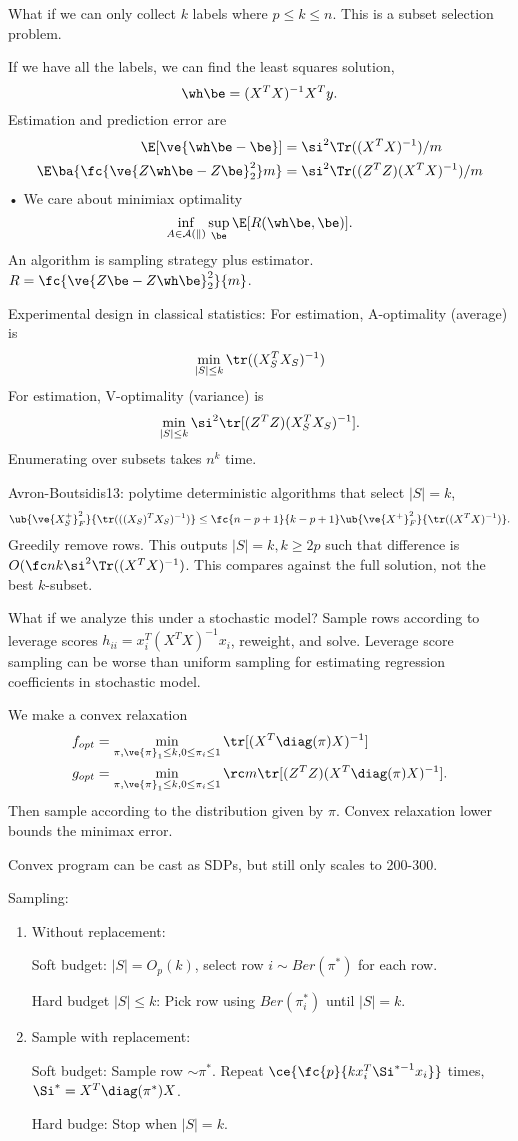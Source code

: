 What if we can only collect $k$ labels where $p\le k\le n$. This is a subset selection problem. 

If we have all the labels, we can find the least squares solution, 
$$
\wh \be = (X^TX)^{-1} X^Ty.
$$
Estimation and prediction error are
\begin{align}
\E[\ve{\wh \be - \be}] &= \si^2\Tr((X^TX)^{-1})/m\\
\E\ba{\fc{\ve{Z\wh \be - Z\be}_2^2}m}&=
\si^2 \Tr((Z^TZ)(X^TX)^{-1})/m
\end{align}•
We care about minimiax optimality
$$
\inf_{A\in \cal A(k)}\sup_\be \E[R(\wh \be , \be)].
$$
An algorithm is sampling strategy plus estimator. $R=\fc{\ve{Z\be - Z\wh \be }_2^2}{m}$.

Experimental design in classical statistics: 
For estimation, A-optimality (average) is 
$$
\min_{|S|\le k}\tr((X_S^TX_S)^{-1})
$$
For estimation, V-optimality (variance) is 
$$\min_{|S|\le k }\si^2\tr[(Z^TZ)(X_S^TX_S)^{-1}].$$
Enumerating over subsets takes $n^k$ time. 

Avron-Boutsidis13: polytime deterministic algorithms that select $|S|=k$, 
$$
\ub{\ve{X_S^+}_F^2}{\tr(((X_S)^TX_S)^{-1})} \le \fc{n-p+1}{k-p+1} \ub{\ve{X^+}_F^2}{\tr((X^TX)^{-1})}.
$$
Greedily remove rows.
This outputs $|S|=k, k\ge 2p$ such that difference is $O(\fc nk \si^2 \Tr((X^TX)^{-1})$. This compares against the full solution, not the best $k$-subset.

What if we analyze this under a stochastic model? 
Sample rows according to leverage scores $h_{ii} = x_i^T(X^TX)^{-1}x_i$, reweight, and solve. Leverage score sampling can be worse than uniform sampling for estimating regression coefficients in stochastic model. %

We make a convex relaxation
\begin{align}
f_{opt} & = \min_{\pi, \ve{\pi}_1\le k, 0\le \pi_i\le 1} \tr[(X^T \diag(\pi)X)^{-1}]\\
g_{opt} &= \min_{\pi, \ve{\pi}_1\le k, 0 \le \pi_i\le 1} \rc m \tr[(Z^TZ)(X^T \diag(\pi) X)^{-1}].
\end{align}
Then sample according to the distribution given by $\pi$. 
Convex relaxation lower bounds the minimax error.

Convex program can be cast as SDPs, but still only scales to 200-300.

Sampling:
\begin{enumerate}
\item
Without replacement:

Soft budget: $|S|=O_p(k)$, select row $i\sim Ber(\pi^*)$ for each row.

Hard budget $|S|\le k$: Pick row using $Ber(\pi_i^*)$ until $|S|=k$.
\item
Sample with replacement:

Soft budget: Sample row $\sim \pi^*$. Repeat $\ce{\fc{p}{kx_i^T{\Si}^{*-1}x_i}}$ times, $\Si^* =X^T\diag(\pi^*)X$. 

Hard budge: Stop when $|S|=k$.
\end{enumerate}

